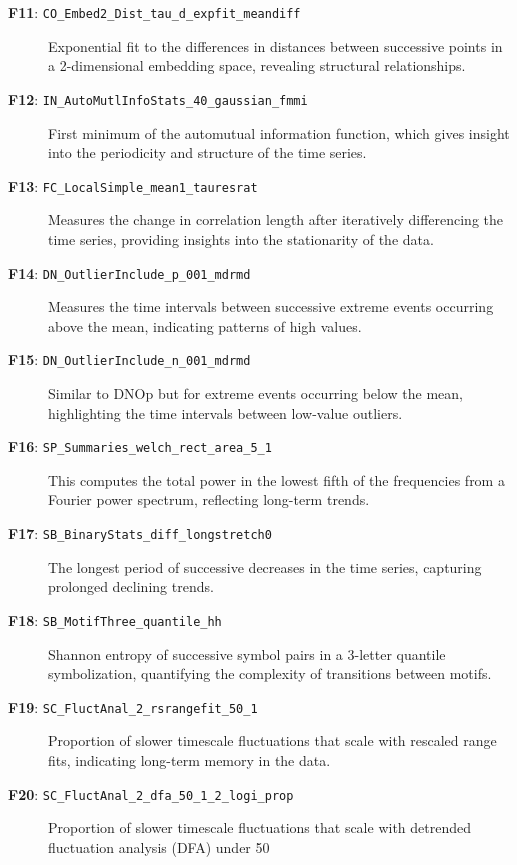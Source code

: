 {\begin{description}
    \item[\textbf{F11}: \texttt{CO\_Embed2\_Dist\_tau\_d\_expfit\_meandiff}] Exponential fit to the differences in distances between successive points in a 2-dimensional embedding space, revealing structural relationships.
    
    \item[\textbf{F12}: \texttt{IN\_AutoMutlInfoStats\_40\_gaussian\_fmmi}] First minimum of the automutual information function, which gives insight into the periodicity and structure of the time series.
    
    \item[\textbf{F13}: \texttt{FC\_LocalSimple\_mean1\_tauresrat}] Measures the change in correlation length after iteratively differencing the time series, providing insights into the stationarity of the data.
    
    \item[\textbf{F14}: \texttt{DN\_OutlierInclude\_p\_001\_mdrmd}] Measures the time intervals between successive extreme events occurring above the mean, indicating patterns of high values.
    
    \item[\textbf{F15}: \texttt{DN\_OutlierInclude\_n\_001\_mdrmd}] Similar to DNOp but for extreme events occurring below the mean, highlighting the time intervals between low-value outliers.
    
    \item[\textbf{F16}: \texttt{SP\_Summaries\_welch\_rect\_area\_5\_1}] This computes the total power in the lowest fifth of the frequencies from a Fourier power spectrum, reflecting long-term trends.
    
    \item[\textbf{F17}: \texttt{SB\_BinaryStats\_diff\_longstretch0}] The longest period of successive decreases in the time series, capturing prolonged declining trends.
    
    \item[\textbf{F18}: \texttt{SB\_MotifThree\_quantile\_hh}] Shannon entropy of successive symbol pairs in a 3-letter quantile symbolization, quantifying the complexity of transitions between motifs.
    
    \item[\textbf{F19}: \texttt{SC\_FluctAnal\_2\_rsrangefit\_50\_1}] Proportion of slower timescale fluctuations that scale with rescaled range fits, indicating long-term memory in the data.
    
    \item[\textbf{F20}: \texttt{SC\_FluctAnal\_2\_dfa\_50\_1\_2\_logi\_prop}] Proportion of slower timescale fluctuations that scale with detrended fluctuation analysis (DFA) under 50
    

\end{description}}
